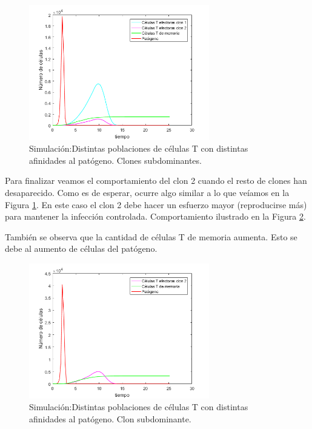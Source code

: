 \begin{figure}[t]
	\centering
	\includegraphics[width=0.7\textwidth]{Imagenes/Simulaciones/dosClones}
	\caption{Simulación:Distintas poblaciones de células T con distintas afinidades al patógeno. Clones subdominantes.}
	\label{fig:dosClones}
\end{figure}

Para finalizar veamos el comportamiento del clon 2 cuando el resto de clones han desaparecido. Como es de esperar, ocurre algo similar a lo que veíamos en la Figura \ref{fig:dosClones}. En este caso el clon 2 debe hacer un esfuerzo mayor (reproducirse más) para mantener la infección controlada. Comportamiento ilustrado en la Figura \ref{fig:unClon}.

También se observa que la cantidad de células T de memoria aumenta. Esto se debe al aumento de células del patógeno. 


\begin{figure}[t]
	\centering
	\includegraphics[width=0.7\textwidth]{Imagenes/Simulaciones/unClon}
	\caption{Simulación:Distintas poblaciones de células T con distintas afinidades al patógeno. Clon subdominante.}
	\label{fig:unClon}
\end{figure}

